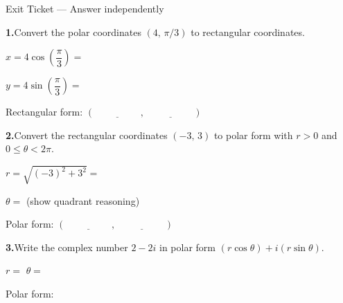 \documentclass[10pt]{article}
\begin{document}
\namedateperiod

\vspace{0.12in}

\begin{notesbox}{Exit Ticket --- Answer independently}

\textbf{1.}\quad Convert the polar coordinates $(4,\, \pi/3)$ to rectangular coordinates.

\vspace{6pt}
$x = 4\cos\!\left(\dfrac{\pi}{3}\right) = $ \underline{\hspace{3.5cm}}

\vspace{8pt}
$y = 4\sin\!\left(\dfrac{\pi}{3}\right) = $ \underline{\hspace{3.5cm}}

\vspace{6pt}
Rectangular form: $(\underline{\hspace{2cm}},\; \underline{\hspace{2cm}})$

\vspace{0.18in}
\textbf{2.}\quad Convert the rectangular coordinates $(-3,\, 3)$ to polar form
with $r > 0$ and $0 \le \theta < 2\pi$.

\vspace{6pt}
$r = \sqrt{(-3)^2 + 3^2} = $ \underline{\hspace{3cm}}

\vspace{8pt}
$\theta = $ \underline{\hspace{5cm}} (show quadrant reasoning)

\vspace{6pt}
Polar form: $(\underline{\hspace{2cm}},\; \underline{\hspace{2cm}})$

\vspace{0.18in}
\textbf{3.}\quad Write the complex number $2 - 2i$ in polar form $(r\cos\theta) + i(r\sin\theta)$.

\vspace{6pt}
$r = $ \underline{\hspace{2.5cm}} \qquad $\theta = $ \underline{\hspace{2.5cm}}

\vspace{6pt}
Polar form: \underline{\hspace{7cm}}

\end{notesbox}
\end{document}
